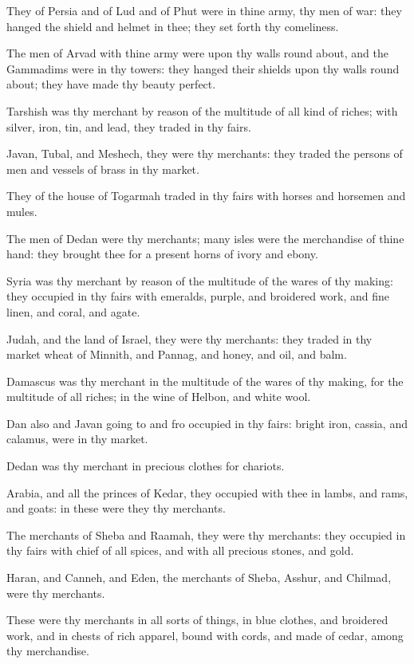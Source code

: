 \verse They of Persia and of Lud and of Phut were in thine army, thy men of war: they hanged the shield and helmet in thee; they set forth thy comeliness.

\verse The men of Arvad with thine army were upon thy walls round about, and the Gammadims were in thy towers: they hanged their shields upon thy walls round about; they have made thy beauty perfect.

\verse Tarshish was thy merchant by reason of the multitude of all kind of riches; with silver, iron, tin, and lead, they traded in thy fairs.

\verse Javan, Tubal, and Meshech, they were thy merchants: they traded the persons of men and vessels of brass in thy market.

\verse They of the house of Togarmah traded in thy fairs with horses and horsemen and mules.

\verse The men of Dedan were thy merchants; many isles were the merchandise of thine hand: they brought thee for a present horns of ivory and ebony.

\verse Syria was thy merchant by reason of the multitude of the wares of thy making: they occupied in thy fairs with emeralds, purple, and broidered work, and fine linen, and coral, and agate.

\verse Judah, and the land of Israel, they were thy merchants: they traded in thy market wheat of Minnith, and Pannag, and honey, and oil, and balm.

\verse Damascus was thy merchant in the multitude of the wares of thy making, for the multitude of all riches; in the wine of Helbon, and white wool.

\verse Dan also and Javan going to and fro occupied in thy fairs: bright iron, cassia, and calamus, were in thy market.

\verse Dedan was thy merchant in precious clothes for chariots.

\verse Arabia, and all the princes of Kedar, they occupied with thee in lambs, and rams, and goats: in these were they thy merchants.

\verse The merchants of Sheba and Raamah, they were thy merchants: they occupied in thy fairs with chief of all spices, and with all precious stones, and gold.

\verse Haran, and Canneh, and Eden, the merchants of Sheba, Asshur, and Chilmad, were thy merchants.

\verse These were thy merchants in all sorts of things, in blue clothes, and broidered work, and in chests of rich apparel, bound with cords, and made of cedar, among thy merchandise.

